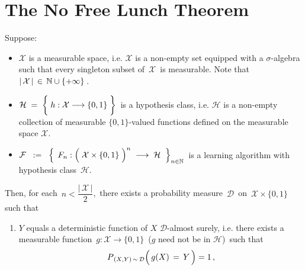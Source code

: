 

\section{The No Free Lunch Theorem}
\setcounter{theorem}{0}
\setcounter{equation}{0}


\renewcommand{\theenumi}{\roman{enumi}}
\renewcommand{\labelenumi}{\textnormal{(\theenumi)}$\;\;$}


\begin{theorem}
\label{Thm:NoFreeLunch}
\mbox{}\vskip 0.1cm
\noindent
Suppose:
\begin{itemize}
\item
	$\mathcal{X}$ is a measurable space, i.e. $\mathcal{X}$ is a non-empty set equipped with a $\sigma$-algebra
	such that every singleton subset of \,$\mathcal{X}$\, is measurable.
	Note that \,$\vert\,\mathcal{X}\,\vert \,\in\, \mathbb{N}\cup\{+\infty\}$\,.
\item
	$\mathcal{H} \; = \; \left\{\; h : \mathcal{X} \overset{{\color{white}\vert}}{\longrightarrow} \{0,1\}\;\right\}$\,
	is a hypothesis class, i.e.
	$\mathcal{H}$ is a non-empty collection of measurable $\{0,1\}$-valued functions defined on the
	measurable space $\mathcal{X}$.
\item
	$\mathcal{F}
	\;\; : = \;\;
		\left\{\;\,
			F_{n} : \left(\;\mathcal{X} \overset{{\color{white}.}}{\times} \{0,1\} \;\right)^{n}
			\; \longrightarrow \;\mathcal{H}
			\;\;\right\}_{n\in\N}$\,
	is a learning algorithm with hypothesis class \,$\mathcal{H}$.
\end{itemize}
Then, for each \,$n < \dfrac{\vert\,\mathcal{X}\,\vert}{2}$,\,
there exists a probability measure \,$\mathcal{D}$\, on
\,$\mathcal{X} \times \{0,1\}$\,
such that
\begin{enumerate}
\item
	$Y$ equals a deterministic function of $X$ $\mathcal{D}$-almost surely, i.e. there exists a
	measurable function \,$g : \mathcal{X} \longrightarrow \{0,1\} $\, ($g$ need not be in $\mathcal{H}$)\,
	such that
	\begin{equation*}
	P_{\,(X,Y)\,\sim\,\mathcal{D}}\!\left(\,g(X) \,\overset{{\color{white}-}}{=}\, Y\,\right) = 1\,,

\end{equation*}
\end{enumerate}
\end{theorem}
